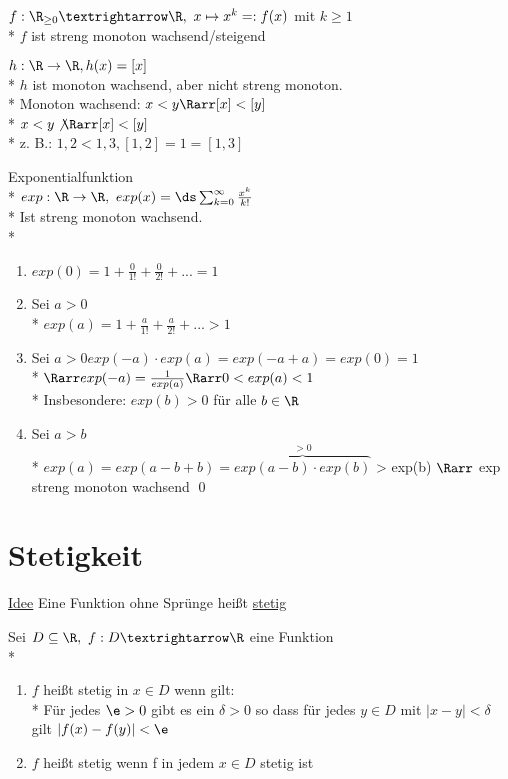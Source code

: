 \begin{enumerate}
\item{$f:\R_{\geq 0}→\R,\ x\mapsto x^k =:f(x)$ mit $k\geq 1$\\*
$f$ ist streng monoton wachsend/steigend 
\item{$h: \R \to \R, h(x) = [x]$}\\*
$h$ ist monoton wachsend, aber nicht streng monoton.\\*
Monoton wachsend: $x < y \Rarr [x] < [y]$\\*
$x < y \not\Rarr [x] < [y]$\\*
z. B.: $1,2 < 1,3 , [1,2] = 1 = [1,3] $}
\item{Exponentialfunktion\\*
$exp: \R \to \R,\ exp(x)= \ds\sum_{k=0}^{\infty} \frac{x^k}{k!}$\\*
Ist streng monoton wachsend.\\*
\bew
\begin{enumerate}
\item{$exp(0) = 1 + \frac{0}{1!} + \frac{0}{2!} + ... = 1$}
\item{Sei $a > 0$\\*
$exp(a) = 1 + \frac{a}{1!} + \frac{a}{2!} + ... > 1$}
\item{Sei $a > 0 exp(-a) \cdot exp(a) = exp(-a + a) = exp(0) = 1$\\*
$\Rarr exp(-a) = \frac{1}{exp(a)} \Rarr 0 < exp(a) < 1$\\*
Insbesondere: $exp(b) > 0$ für alle $b \in \R$}
\item{Sei $a > b$\\*
$exp(a) = exp(a - b + b) = \overbrace{exp(a - b) \cdot exp(b)}^{>0}$
> exp(b) $\Rarr$ exp streng monoton wachsend \qed }
\end{enumerate}
}
\end{enumerate}

\chapter{Stetigkeit}
\ul{Idee} Eine Funktion ohne Sprünge heißt \ul{stetig}

Sei $D\subseteq \R,\ f:D→\R$ eine Funktion\\*
\begin{enumerate}
\item{$f$ heißt stetig in $x\in D$ wenn gilt:\\*
Für jedes $\e>0$ gibt es ein $\delta>0$ so dass für jedes $y\in D$ mit $|x-y|<\delta$ gilt $|f(x)-f(y)|<\e$ %
}
\item{$f$ heißt stetig wenn f in jedem $x\in D$ stetig ist}
\end{enumerate}

